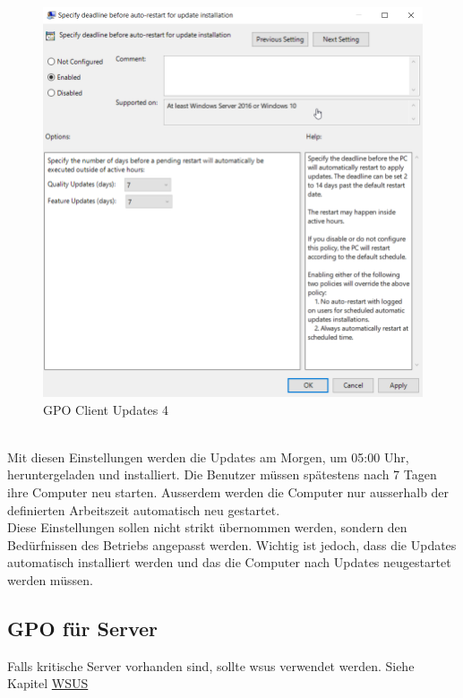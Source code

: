 \begin{minipage}{0.5\linewidth}
    \begin{figure}[H]
        \centering
        \includegraphics[width=\linewidth]{../img/Updates/client-force-restart-deadline.png}
        \caption{GPO Client Updates 4}
    \end{figure}
\end{minipage}\\

Mit diesen Einstellungen werden die Updates am Morgen, um 05:00 Uhr,  heruntergeladen und installiert.
Die Benutzer müssen spätestens nach 7 Tagen ihre Computer neu starten.
Ausserdem werden die Computer nur ausserhalb der definierten Arbeitszeit automatisch neu gestartet.\\

Diese Einstellungen sollen nicht strikt übernommen werden, sondern den Bedürfnissen des Betriebs angepasst werden.
Wichtig ist jedoch, dass die Updates automatisch installiert werden und das die Computer nach Updates neugestartet werden müssen.

\subsection{GPO für Server}
Falls kritische Server vorhanden sind, sollte \acrfull{wsus} verwendet werden. Siehe Kapitel \hyperref[subsec:wsus]{WSUS}\\

